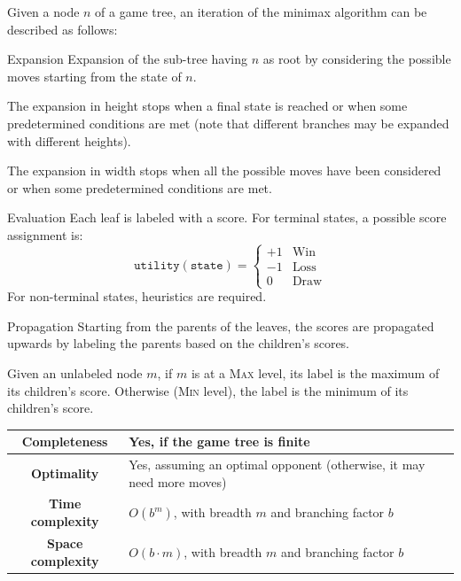 Given a node $n$ of a game tree,
an iteration of the minimax algorithm can be described as follows:
\begin{descriptionlist}
    \item[Expansion] 
        Expansion of the sub-tree having $n$ as root by considering the possible moves starting from the state of $n$.
        
        The expansion in height stops when a final state is reached or when some predetermined conditions are met 
        (note that different branches may be expanded with different heights).

        The expansion in width stops when all the possible moves have been considered or when some predetermined conditions are met.

    \item[Evaluation]
        Each leaf is labeled with a score.
        For terminal states, a possible score assignment is:
        \[ \texttt{utility}(\texttt{state}) = \begin{cases}
            +1 & \text{Win} \\
            -1 & \text{Loss} \\
            0 & \text{Draw}
        \end{cases} \]
        For non-terminal states, heuristics are required.

    \item[Propagation]
        Starting from the parents of the leaves, the scores are propagated upwards 
        by labeling the parents based on the children's scores.

        Given an unlabeled node $m$, if $m$ is at a \textsc{Max} level, its label is the maximum of its children's score.
        Otherwise (\textsc{Min} level), the label is the minimum of its children's score.
\end{descriptionlist}


\begin{center}
    \def\arraystretch{1.2}
    \begin{tabular}{c | m{10cm}}
        \hline
        \textbf{Completeness} & Yes, if the game tree is finite \\
        \hline
        \textbf{Optimality} & Yes, assuming an optimal opponent (otherwise, it may need more moves) \\
        \hline
        \textbf{Time complexity}
            & $O(b^m)$, with breadth $m$ and branching factor $b$ \\
        \hline
        \textbf{Space complexity}
            & $O(b \cdot m)$, with breadth $m$ and branching factor $b$ \\
        \hline
    \end{tabular}
\end{center}

